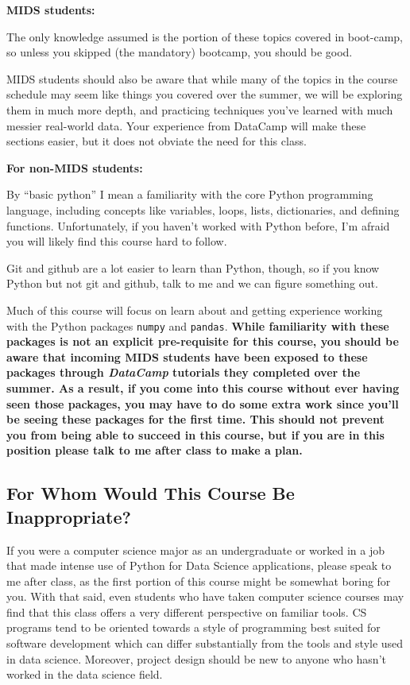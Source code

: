\documentclass[12pt]{article}
\begin{document}
\textbf{MIDS students:}

The only knowledge assumed is the portion of these topics covered in boot-camp, so unless you skipped (the mandatory) bootcamp, you should be good.

MIDS students should also be aware that while many of the topics in the course schedule may seem like things you covered over the summer, we will be exploring them in much more depth, and practicing techniques you've learned with much messier real-world data. Your experience from DataCamp will make these sections easier, but it does not obviate the need for this class.

\textbf{For non-MIDS students:}

By ``basic python'' I mean a familiarity with the core Python programming language, including concepts like variables, loops, lists, dictionaries, and defining functions. Unfortunately, if you haven't worked with Python before, I'm afraid you will likely find this course hard to follow.

Git and github are a lot easier to learn than Python, though, so if you know Python but not git and github, talk to me and we can figure something out.

Much of this course will focus on learn about and getting experience working with the Python packages \texttt{numpy} and \texttt{pandas}. \textbf{While familiarity with these packages is not an explicit pre-requisite for this course, you should be aware that incoming MIDS students have been exposed to these packages through \emph{DataCamp} tutorials they completed over the summer. As a result, if you come into this course without ever having seen those packages, you may have to do some extra work since you'll be seeing these packages for the first time. This should not prevent you from being able to succeed in this course, but if you are in this position please talk to me after class to make a plan.}

\subsection{For Whom Would This Course Be Inappropriate?}

If you were a computer science major as an undergraduate or worked in a job that made intense use of Python for Data Science applications, please speak to me after class, as the first portion of this course might be somewhat boring for you. With that said, even students who have taken computer science courses may find that this class offers a very different perspective on familiar tools. CS programs tend to be oriented towards a style of programming best suited for software development which can differ substantially from the tools and style used in data science. Moreover, project design should be new to anyone who hasn't worked in the data science field.
\end{document}
